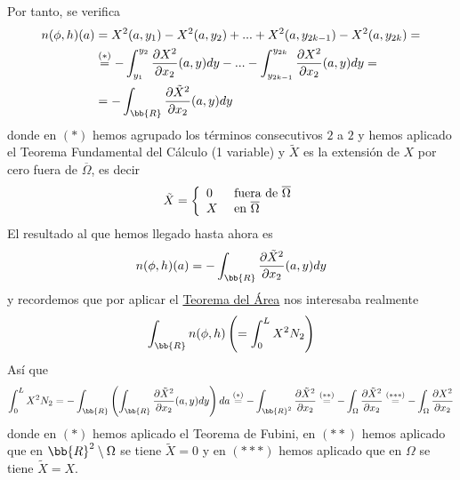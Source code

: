 Por tanto, se verifica
\begin{align*}
    n(\phi, h)(a) &= X^2(a,y_1)-X^2(a,y_2) + ... + X^2(a,y_{2k-1}) - X^2(a,y_{2k}) =\\
    &\overset{(\ast)}{=} - \int_{y_1}^{y_2} \frac{\partial X^2}{\partial x_2} (a,y)dy - ... - \int_{y_{2k-1}}^{y_{2k}} \frac{\partial X^2}{\partial x_2} (a,y)dy =\\
    &= -\int_\bb{R} \frac{\partial \tilde{X}^2}{\partial x_2}(a,y) dy
\end{align*}
donde en $(\ast)$ hemos agrupado los términos consecutivos $2$ a $2$ y hemos aplicado el Teorema Fundamental del Cálculo (1 variable) y $\tilde{X}$ es la extensión de $X$ por cero fuera de $\overline{\Omega}$, es decir
\begin{gather*}
    \tilde{X} = 
    \left\{
        \begin{array}{l l}
            0 & \text{ fuera de $\overline{\Omega}$}\\
            X & \text{ en  $\overline{\Omega}$}
        \end{array}
    \right.
\end{gather*}
El resultado al que hemos llegado hasta ahora es 
\begin{gather*}
    n(\phi, h)(a) = -\int_\bb{R} \frac{\partial \tilde{X}^2}{\partial x_2}(a,y) dy
\end{gather*}
y recordemos que por aplicar el \hyperref[teo:area]{Teorema del Área} nos interesaba realmente
\begin{gather*}
    \int_\bb{R} n(\phi, h) \left( = \int_0^L X^2N_2 \right)
\end{gather*}
Así que
\begin{gather*}
    \int_0^L X^2N_2 = - \int_\bb{R} \left(\int_\bb{R} \frac{\partial \tilde{X}^2}{\partial x_2}(a,y) dy\right)da \overset{(\ast)}{=} -\int_{\bb{R}^2} \frac{\partial \tilde{X}^2}{\partial x_2} \overset{(\ast\ast)}{=} - \int_\Omega \frac{\partial \tilde{X}^2}{\partial x_2} \overset{(\ast\ast\ast)}{=} -\int_\Omega \frac{\partial X^2}{\partial x_2} 
\end{gather*}
donde en $(\ast)$ hemos aplicado el Teorema de Fubini, en $(\ast\ast)$ hemos aplicado que en $\bb{R}^2 \setminus\Omega$ se tiene $\tilde{X}=0$ y en $(\ast\ast\ast)$ hemos aplicado que en $\Omega$ se tiene $\tilde{X}=X$.\\

